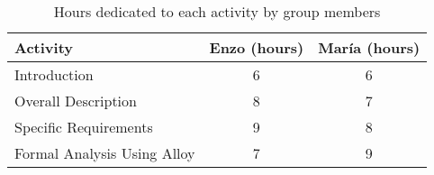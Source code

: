 \begin{table}[H]
\centering
\begin{tabular}{|l|c|c|}
\hline
\textbf{Activity} & \textbf{Enzo (hours)} & \textbf{María (hours)} \\ \hline
Introduction & 6 & 6 \\ \hline
Overall Description & 8 & 7 \\ \hline
Specific Requirements & 9 & 8 \\ \hline
Formal Analysis Using Alloy & 7 & 9 \\ \hline
\end{tabular}
\caption{Hours dedicated to each activity by group members}
\label{tab:hours_dedication}
\end{table}

